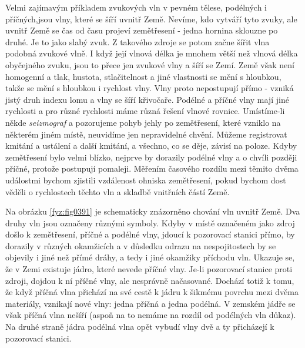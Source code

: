   Velmi zajímavým příkladem zvukových vln v pevném tělese, podélných i příčných,jsou vlny, které se 
  šíří uvnitř Země. Nevíme, kdo vytváří tyto zvuky, ale uvnitř Země se čas od času projeví 
  zemětřesení - jedna hornina sklouzne po druhé. Je to jako slabý zvuk. Z takového zdroje se potom 
  začne šířit vlna podobná zvukové vlně. I když její vlnová délka je mnohem větší než vlnová délka 
  obyčejného zvuku, jsou to přece jen zvukové vlny a šíří se Zemí. Země však není homogenní a tlak, 
  hustota, stlačitelnost a jiné vlastnosti se mění s hloubkou, takže se mění s hloubkou i rychlost 
  vlny. Vlny proto nepostupují přímo - vzniká jistý druh indexu lomu a vlny se šíří křivočaře. 
  Podélné a příčné vlny mají jiné rychlosti a pro různé rychlosti máme různá řešení vlnové rovnice. 
  Umístíme-li někde \emph{seizmograf} a pozorujeme pohyb jehly po zemětřesení, které vzniklo na 
  některém jiném místě, neuvidíme jen nepravidelné chvění. Můžeme registrovat kmitání a ustálení a 
  další kmitání, a všechno, co se děje, závisí na poloze. Kdyby zemětřesení bylo velmi blízko, 
  nejprve by dorazily podélné vlny a o chvíli později příčné, protože postupují pomaleji. Měřením 
  časového rozdílu mezi těmito dvěma událostmi bychom zjistili vzdálenost ohniska zemětřesení, 
  pokud bychom dost věděli o rychlostech těchto vln a skladbě vnitřních částí Země.
  
  Na obrázku \ref{fyz:fig0391} je schematicky znázorněno chování vln uvnitř Země. Dva druhy vln jsou 
  označeny různými symboly. Kdyby v místě označeném jako zdroj došlo k zemětřesení, příčné a 
  podélné vlny, jdoucí k pozorovací stanici přímo, by dorazily v různých okamžicích a v důsledku 
  odrazu na nespojitostech by se objevily i jiné než přímé dráhy, a tedy i jiné okamžiky příchodu 
  vln. Ukazuje se, že v Zemi existuje jádro, které nevede příčné vlny. Je-li pozorovací stanice 
  proti zdroji, dojdou k ní příčné vlny, ale nesprávně načasované. Dochází totiž k tomu, že když 
  příčná vlna přichází na své cestě k jádru k šikmému povrchu mezi dvěma materiály, vznikají nové 
  vlny: jedna příčná a jedna podélná. V zemském jádře se však příčná vlna nešíří (aspoň na to 
  nemáme na rozdíl od podélných vln důkaz). Na druhé straně jádra podélná vlna opět vybudí vlny dvě 
  a ty přicházejí k pozorovací stanici.
  
